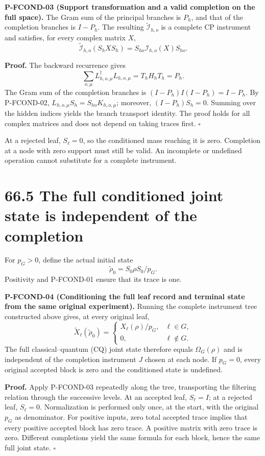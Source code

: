 \documentclass[
  11pt,
  oneside]{book}
\begin{document}
\label{p-fcond-03}{} \textbf{P-FCOND-03 (Support
transformation and a valid completion on the full space).} The Gram sum
of the principal branches is \(P_h\), and that of the completion
branches is \(I-P_h\). The resulting \(\widetilde{\mathcal I}_{h,o}\) is
a complete CP instrument and satisfies, for every complex matrix \(X\),
\[
\widetilde{\mathcal I}_{h,o}(S_hXS_h)
=S_{ho}\mathcal I_{h,o}(X)S_{ho}.
\]

\textbf{Proof.} The backward recurrence gives \[
\sum_{o,\mu}L_{h,o,\mu}^{\dagger}L_{h,o,\mu}
=T_hH_hT_h=P_h.
\] The Gram sum of the completion branches is \((I-P_h)I(I-P_h)=I-P_h\).
By P-FCOND-02, \(L_{h,o,\mu}S_h=S_{ho}K_{h,o,\mu}\); moreover,
\((I-P_h)S_h=0\). Summing over the hidden indices yields the branch
transport identity. The proof holds for all complex matrices and does
not depend on taking traces first. \(\square\)

At a rejected leaf, \(S_\ell=0\), so the conditioned mass reaching it is
zero. Completion at a node with zero support must still be valid. An
incomplete or undefined operation cannot substitute for a complete
instrument.

\section{66.5 The full conditioned joint state is independent of the
completion}

For \(p_G>0\), define the actual initial state \[
\widetilde\rho_0=S_0\rho S_0/p_G.
\] Positivity and P-FCOND-01 ensure that its trace is one.

\label{p-fcond-04}{} \textbf{P-FCOND-04 (Conditioning the
full leaf record and terminal state from the same original experiment).}
Running the complete instrument tree constructed above gives, at every
original leaf, \[
\widetilde X_\ell(\widetilde\rho_0)=
\begin{cases}X_\ell(\rho)/p_G,&\ell\in G,\\0,&\ell\notin G.\end{cases}
\] The full classical--quantum (CQ) joint state therefore equals
\(\Omega_G(\rho)\) and is independent of the completion instrument \(J\)
chosen at each node. If \(p_G=0\), every original accepted block is zero
and the conditioned state is undefined.

\textbf{Proof.} Apply P-FCOND-03 repeatedly along the tree, transporting
the filtering relation through the successive levels. At an accepted
leaf, \(S_\ell=I\); at a rejected leaf, \(S_\ell=0\). Normalization is
performed only once, at the start, with the original \(p_G\) as
denominator. For positive inputs, zero total accepted trace implies that
every positive accepted block has zero trace. A positive matrix with
zero trace is zero. Different completions yield the same formula for
each block, hence the same full joint state. \(\square\)
\end{document}
